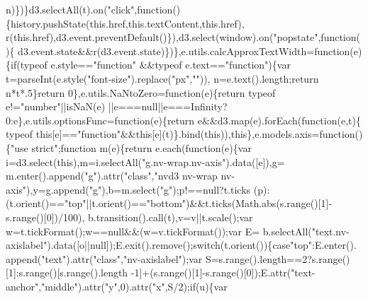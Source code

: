 \begin{DoxyCode}
      n)\})\}d3.selectAll(t).on(\textcolor{stringliteral}{"click"},\textcolor{keyword}{function}()\{history.pushState(this.href,this.textContent,this.href),
      r(this.href),d3.event.preventDefault()\}),d3.select(window).on(\textcolor{stringliteral}{"popstate"},\textcolor{keyword}{function}()\{
      d3.event.state&&r(d3.event.state)\})\},e.utils.calcApproxTextWidth=\textcolor{keyword}{function}(e)\{\textcolor{keywordflow}{if}(typeof e.style==\textcolor{stringliteral}{"function"}
      &&typeof e.text==\textcolor{stringliteral}{"function"})\{var t=parseInt(e.style(\textcolor{stringliteral}{"font-size"}).replace(\textcolor{stringliteral}{"px"},\textcolor{stringliteral}{""})),
      n=e.text().length;\textcolor{keywordflow}{return} n*t*.5\}\textcolor{keywordflow}{return} 0\},e.utils.NaNtoZero=\textcolor{keyword}{function}(e)\{\textcolor{keywordflow}{return} typeof e!=\textcolor{stringliteral}{"number"}||isNaN(e)
      ||e===null||e===Infinity?0:e\},e.utils.optionsFunc=\textcolor{keyword}{function}(e)\{\textcolor{keywordflow}{return} e&&d3.map(e).forEach(\textcolor{keyword}{function}(e,t)\{
      typeof \textcolor{keyword}{this}[e]==\textcolor{stringliteral}{"function"}&&\textcolor{keyword}{this}[e](t)\}.bind(\textcolor{keyword}{this})),\textcolor{keyword}{this}\},e.models.axis=\textcolor{keyword}{function}()\{\textcolor{stringliteral}{"use strict"};\textcolor{keyword}{function} 
      m(e)\{\textcolor{keywordflow}{return} e.each(\textcolor{keyword}{function}(e)\{var i=d3.select(\textcolor{keyword}{this}),m=i.selectAll(\textcolor{stringliteral}{"g.nv-wrap.nv-axis"}).data([e]),g=
      m.enter().append(\textcolor{stringliteral}{"g"}).attr(\textcolor{stringliteral}{"class"},\textcolor{stringliteral}{"nvd3 nv-wrap nv-axis"}),y=g.append(\textcolor{stringliteral}{"g"}),b=m.select(\textcolor{stringliteral}{"g"});p!==null?t.ticks
      (p):(t.orient()==\textcolor{stringliteral}{"top"}||t.orient()==\textcolor{stringliteral}{"bottom"})&&t.ticks(Math.abs(s.range()[1]-s.range()[0])/100),
      b.transition().call(t),v=v||t.scale();var w=t.tickFormat();w==null&&(w=v.tickFormat());var E=
      b.selectAll(\textcolor{stringliteral}{"text.nv-axislabel"}).data([o||null]);E.exit().remove();\textcolor{keywordflow}{switch}(t.orient())\{\textcolor{keywordflow}{case}\textcolor{stringliteral}{"top"}:E.enter().
      append(\textcolor{stringliteral}{"text"}).attr(\textcolor{stringliteral}{"class"},\textcolor{stringliteral}{"nv-axislabel"});var S=s.range().length==2?s.range()[1]:s.range()[s.range().length
      -1]+(s.range()[1]-s.range()[0]);E.attr(\textcolor{stringliteral}{"text-anchor"},\textcolor{stringliteral}{"middle"}).attr(\textcolor{stringliteral}{"y"},0).attr(\textcolor{stringliteral}{"x"},S/2);\textcolor{keywordflow}{if}(u)\{var 

\end{DoxyCode}
